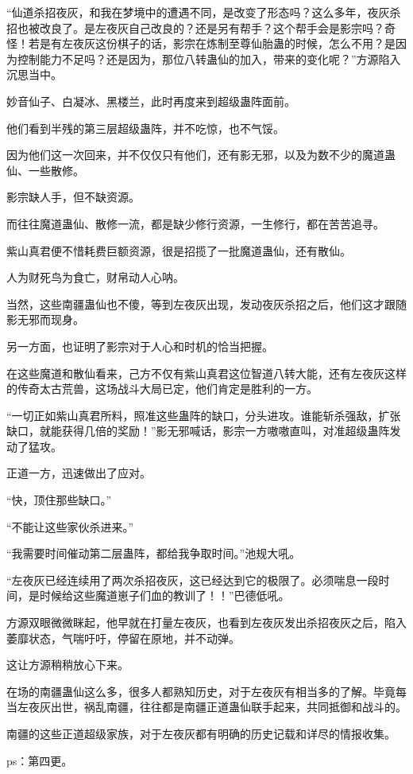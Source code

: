 \begin{this_body}
“仙道杀招夜灰，和我在梦境中的遭遇不同，是改变了形态吗？这么多年，夜灰杀招也被改良了。是左夜灰自己改良的？还是另有帮手？这个帮手会是影宗吗？奇怪！若是有左夜灰这份棋子的话，影宗在炼制至尊仙胎蛊的时候，怎么不用？是因为控制能力不足吗？还是因为，那位八转蛊仙的加入，带来的变化呢？”方源陷入沉思当中。

妙音仙子、白凝冰、黑楼兰，此时再度来到超级蛊阵面前。

他们看到半残的第三层超级蛊阵，并不吃惊，也不气馁。

因为他们这一次回来，并不仅仅只有他们，还有影无邪，以及为数不少的魔道蛊仙、一些散修。

影宗缺人手，但不缺资源。

而往往魔道蛊仙、散修一流，都是缺少修行资源，一生修行，都在苦苦追寻。

紫山真君便不惜耗费巨额资源，很是招揽了一批魔道蛊仙，还有散仙。

人为财死鸟为食亡，财帛动人心呐。

当然，这些南疆蛊仙也不傻，等到左夜灰出现，发动夜灰杀招之后，他们这才跟随影无邪而现身。

另一方面，也证明了影宗对于人心和时机的恰当把握。

在这些魔道和散仙看来，己方不仅有紫山真君这位智道八转大能，还有左夜灰这样的传奇太古荒兽，这场战斗大局已定，他们肯定是胜利的一方。

“一切正如紫山真君所料，照准这些蛊阵的缺口，分头进攻。谁能斩杀强敌，扩张缺口，就能获得几倍的奖励！”影无邪喊话，影宗一方嗷嗷直叫，对准超级蛊阵发动了猛攻。

正道一方，迅速做出了应对。

“快，顶住那些缺口。”

“不能让这些家伙杀进来。”

“我需要时间催动第二层蛊阵，都给我争取时间。”池规大吼。

“左夜灰已经连续用了两次杀招夜灰，这已经达到它的极限了。必须喘息一段时间，是时候给这些魔道崽子们血的教训了！！”巴德低吼。

方源双眼微微眯起，他早就在打量左夜灰，也看到左夜灰发出杀招夜灰之后，陷入萎靡状态，气喘吁吁，停留在原地，并不动弹。

这让方源稍稍放心下来。

在场的南疆蛊仙这么多，很多人都熟知历史，对于左夜灰有相当多的了解。毕竟每当左夜灰出世，祸乱南疆，往往都是南疆正道蛊仙联手起来，共同抵御和战斗的。

南疆的这些正道超级家族，对于左夜灰都有明确的历史记载和详尽的情报收集。

ps：第四更。

\end{this_body}

